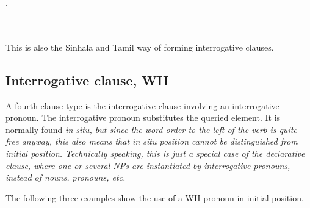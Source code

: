 

.

\\ 

\\  
 

This is also the Sinhala and Tamil way of forming interrogative clauses.


\subsection{Interrogative clause, WH}\label{sec:cls:InterrogativeclauseWH}
A fourth clause type is the interrogative clause involving an interrogative pronoun.
The interrogative pronoun substitutes the queried element. It is normally found \em in situ\em, but since the word order to the left of the verb is quite free anyway, this  also means that \em in situ \em position cannot be distinguished from initial position. Technically speaking, this is just a special case of the declarative clause, where one or several NPs are instantiated by interrogative pronouns, instead of nouns, pronouns, etc.



The following three examples show the use of a WH-pronoun in initial position.



